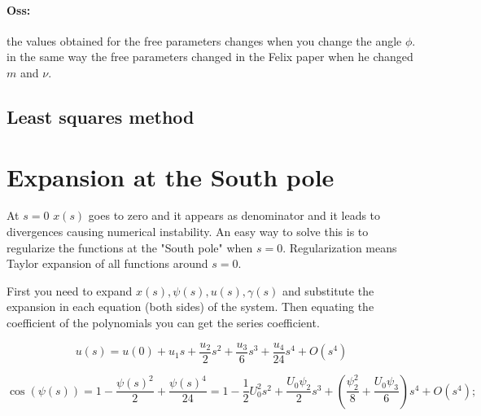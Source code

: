 \documentclass[12pt]{article}
\begin{document}
\paragraph{Oss:} the values obtained for the free parameters changes when you change the angle $\phi$. in the same way the free parameters changed in the Felix paper when he changed $m$ and $\nu$.


\subsection{Least squares method}

\section{Expansion at the South pole}

At $s=0$ $x(s)$ goes to zero and it appears as denominator and it leads to divergences causing numerical instability. An easy way to solve this is to regularize the functions at the "South pole" when $s=0$. Regularization means Taylor expansion of all functions around $s=0$.


First you need to expand $x(s),\psi(s),u(s),\gamma(s)$ and substitute the expansion in each equation (both sides) of the system. Then equating the coefficient of the polynomials you can get the series coefficient.

$$
u(s)=u(0) + u_1s + \frac{u_2 }{2}s^2 + \frac{u_3 }{6}s^3 + \frac{u_4 }{24}s^4 + O(s^4)
$$


$$
\cos(\psi(s))= 1 - \frac{\psi(s)^2}{2} + \frac{\psi(s)^4}{24} = 1 - \frac{1}{2} U_0^2 s^2 + \frac{U_0 \psi_2}{2} s^3 + (\frac{\psi_2^2}{8} + \frac{U_0 \psi_3}{6}) s^4 +O(s^4);
$$









\end{document}
